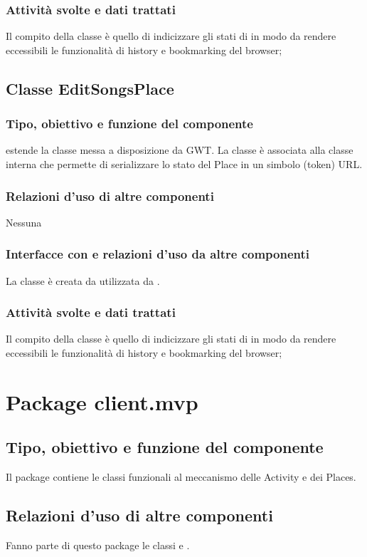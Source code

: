 \subsubsection*{Attivit\`a svolte e dati trattati}
Il compito della classe \`e quello di indicizzare gli stati di
 in modo da rendere eccessibili le funzionalit\`a di history e
bookmarking del browser;

\subsection{Classe EditSongsPlace}
\subsubsection*{Tipo, obiettivo e funzione del componente}
 estende la classe  messa a disposizione da GWT. La
classe \`e associata alla classe interna  che permette di
serializzare lo stato del Place in un simbolo (token) URL.
\subsubsection*{Relazioni d'uso di altre componenti}
Nessuna
\subsubsection*{Interfacce con e relazioni d'uso da altre componenti}
La classe \`e creata da  utilizzata da .
\subsubsection*{Attivit\`a svolte e dati trattati}
Il compito della classe \`e quello di indicizzare gli stati di
 in modo da rendere eccessibili le funzionalit\`a di history e
bookmarking del browser;

\newpage
\section{Package client.mvp} %
\subsection*{Tipo, obiettivo e funzione del componente}
Il package contiene le classi funzionali al meccanismo delle Activity e dei
Places.
\subsection*{Relazioni d'uso di altre componenti}
Fanno parte di questo package le classi  e
.
